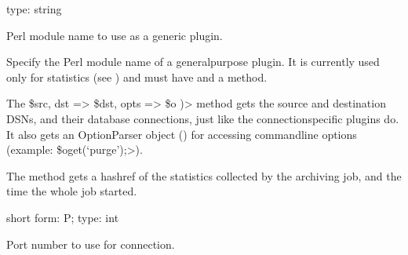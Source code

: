 \documentclass[letterpaper,10pt,english]{sphinxmanual}
\begin{document}
\begin{fulllineitems}
\label{\detokenize{mariadb-archiver:cmdoption-mariadb-archiver-plugin}}
\sphinxAtStartPar
type: string

\sphinxAtStartPar
Perl module name to use as a generic plugin.

\sphinxAtStartPar
Specify the Perl module name of a general\sphinxhyphen{}purpose plugin.  It is currently used
only for statistics (see {\hyperref[\detokenize{mariadb-archiver:cmdoption-mariadb-archiver-statistics}]{}}) and must have  and a
 method.

\sphinxAtStartPar
The  \$src, dst =\textgreater{} \$dst, opts =\textgreater{} \$o )\textgreater{} method gets the source
and destination DSNs, and their database connections, just like the
connection\sphinxhyphen{}specific plugins do.  It also gets an OptionParser object () for
accessing command\sphinxhyphen{}line options (example: {\color{red}\bfseries{}\textasciigrave{}\textasciigrave{}}\$o\sphinxhyphen{}{\color{red}\bfseries{}\textasciigrave{}\textasciigrave{}}get(‘purge’);\textgreater{}).

\sphinxAtStartPar
The  method gets a hashref of the statistics
collected by the archiving job, and the time the whole job started.

\end{fulllineitems}


\begin{fulllineitems}
\label{\detokenize{mariadb-archiver:cmdoption-mariadb-archiver-port}}
\sphinxAtStartPar
short form: \sphinxhyphen{}P; type: int

\sphinxAtStartPar
Port number to use for connection.

\end{fulllineitems}
\end{document}
